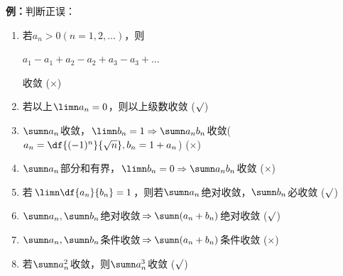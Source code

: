 \begin{center}
\end{center}

{\bf 例：}判断正误：
\begin{enumerate}[(1)]
  \setlength{\itemindent}{1cm}
  \item 若$a_n>0(n=1,2,\ldots)$，则\\
  \centerline{$a_1-a_1+a_2-a_2+a_3-a_3+\ldots $}
  收敛 \hfill ({$\times$})
  \item 若以上$\limn a_n=0$，则以上级数收敛 \hfill
  ({$\surd$})
  \item $\sumn a_n$收敛，$\limn b_n=1\Rightarrow\sumn
  a_nb_n$收敛($a_n=\df{(-1)^n}{\sqrt n},b_n=1+a_n$) \hfill ({$\times$})
  \item $\sumn a_n$部分和有界，$\limn b_n=0\Rightarrow\sumn a_nb_n$收敛
  \hfill ({$\times$})
  \item 若$\limn\df{a_n}{b_n}=1$，则若$\sumn a_n$绝对收敛，$\sumn b_n$必收敛 \hfill
  ({$\surd$})
  \item $\sumn a_n,\sumn b_n$绝对收敛$\Rightarrow\sumn (a_n+b_n)$绝对收敛 \hfill
  ({$\surd$})
  \item $\sumn a_n,\sumn b_n$条件收敛$\Rightarrow\sumn (a_n+b_n)$条件收敛 \hfill
  ({$\times$})
  \item 若$\sumn a_n^2$收敛，则$\sumn a_n^3$收敛 \hfill
  ({$\surd$})
\end{enumerate}

